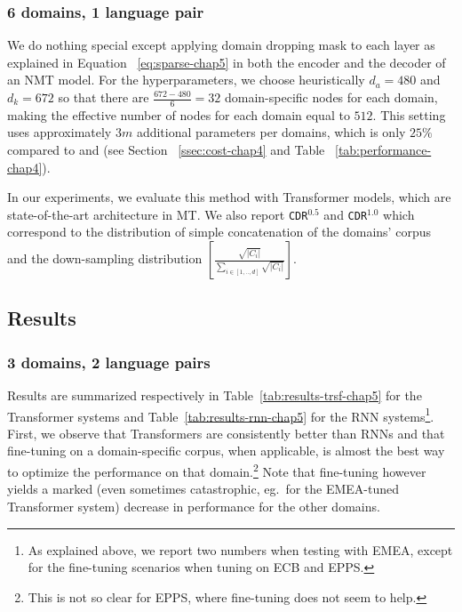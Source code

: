 \subsubsection{6 domains, 1 language pair}
We do nothing special except applying domain dropping mask to each layer as explained in Equation ~\eqref{eq:sparse-chap5} in both the encoder and the decoder of an NMT model. For the hyperparameters, we choose heuristically $d_a = 480$ and $d_k = 672$ so that there are $\frac{672-480}{6} = 32$ domain-specific nodes for each domain, making the effective number of nodes for each domain equal to $512$. This setting uses approximately $3m$ additional parameters per domains, which is only $25\%$ compared to  and  (see Section ~\ref{ssec:cost-chap4} and Table ~\ref{tab:performance-chap4}).

In our experiments, we evaluate this method with Transformer models, which are state-of-the-art architecture in MT. We also report \texttt{CDR}$^{0.5}$ and \texttt{CDR}$^{1.0}$ which correspond to the distribution of simple concatenation of the domains' corpus and the down-sampling distribution $[\frac{\sqrt{|C_i|}}{\sum_{i\in [1,..,d]}\sqrt{|C_i|}}]$.

\subsection{Results \label{ssec:results-chap5}}
\subsubsection{3 domains, 2 language pairs}
\label{sssection:3domain-chap5}
Results are summarized respectively in Table~\ref{tab:results-trsf-chap5} for the Transformer systems and Table~\ref{tab:results-rnn-chap5} for the RNN systems\footnote{As explained above, we  report two numbers when testing with EMEA, except for the fine-tuning scenarios when tuning on ECB and EPPS.}. First, we observe that Transformers are consistently better than RNNs and that fine-tuning on a domain-specific corpus, when applicable, is almost the best way to optimize the performance on that domain.\footnote{This is not so clear for EPPS, where fine-tuning does not seem to help.}  
Note that fine-tuning however yields a marked (even sometimes catastrophic, eg.\ for the EMEA-tuned Transformer system) decrease in performance for the other domains. 

